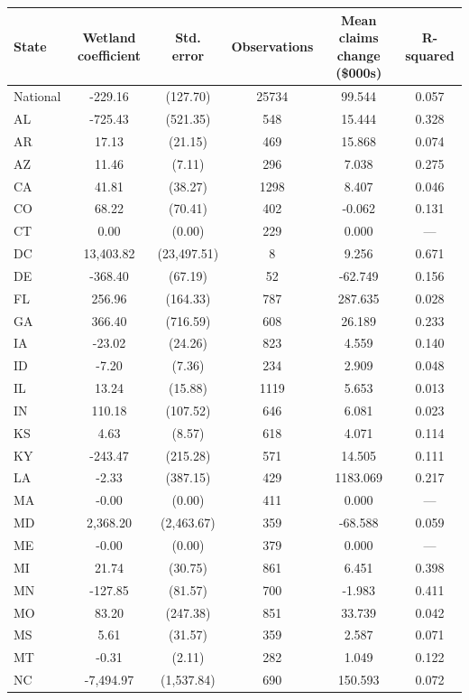 
\begin{tabular}{lccccc}
\toprule
State & Wetland coefficient & Std. error & Observations & Mean claims change (\$000s) & R-squared\\
\midrule
National & -229.16 & (127.70) & 25734 & 99.544 & 0.057\\
AL & -725.43 & (521.35) & 548 & 15.444 & 0.328\\
AR & 17.13 & (21.15) & 469 & 15.868 & 0.074\\
AZ & 11.46 & (7.11) & 296 & 7.038 & 0.275\\
CA & 41.81 & (38.27) & 1298 & 8.407 & 0.046\\
\addlinespace
CO & 68.22 & (70.41) & 402 & -0.062 & 0.131\\
CT & 0.00 & (0.00) & 229 & 0.000 & —\\
DC & 13,403.82 & (23,497.51) & 8 & 9.256 & 0.671\\
DE & -368.40 & (67.19) & 52 & -62.749 & 0.156\\
FL & 256.96 & (164.33) & 787 & 287.635 & 0.028\\
\addlinespace
GA & 366.40 & (716.59) & 608 & 26.189 & 0.233\\
IA & -23.02 & (24.26) & 823 & 4.559 & 0.140\\
ID & -7.20 & (7.36) & 234 & 2.909 & 0.048\\
IL & 13.24 & (15.88) & 1119 & 5.653 & 0.013\\
IN & 110.18 & (107.52) & 646 & 6.081 & 0.023\\
\addlinespace
KS & 4.63 & (8.57) & 618 & 4.071 & 0.114\\
KY & -243.47 & (215.28) & 571 & 14.505 & 0.111\\
LA & -2.33 & (387.15) & 429 & 1183.069 & 0.217\\
MA & -0.00 & (0.00) & 411 & 0.000 & —\\
MD & 2,368.20 & (2,463.67) & 359 & -68.588 & 0.059\\
\addlinespace
ME & -0.00 & (0.00) & 379 & 0.000 & —\\
MI & 21.74 & (30.75) & 861 & 6.451 & 0.398\\
MN & -127.85 & (81.57) & 700 & -1.983 & 0.411\\
MO & 83.20 & (247.38) & 851 & 33.739 & 0.042\\
MS & 5.61 & (31.57) & 359 & 2.587 & 0.071\\
\addlinespace
MT & -0.31 & (2.11) & 282 & 1.049 & 0.122\\
NC & -7,494.97 & (1,537.84) & 690 & 150.593 & 0.072\\

\end{tabular}
